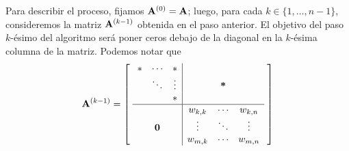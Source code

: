 Para describir el proceso, fijamos $\mathbf{A}^{(0)} = \mathbf{A}$; luego, para
cada $k \in \{1,\dots,n-1\}$, consideremos la matriz $\mathbf{A}^{(k-1)}$
obtenida en el paso anterior.
El objetivo del paso $k$-ésimo del algoritmo será poner ceros debajo de
la diagonal en la $k$-ésima columna de la matriz. Podemos notar que
\[
\mathbf{A}^{(k-1)} = \left[ \hspace{.1cm} \begin{array}{ccc|ccc}
    \ast & \cdots  & \ast   &         &            &         \\
         & \ddots  & \vdots &         & \textbf{*} &         \\
         &         & \ast   &         &            &         \\ \hline
         &         &        & w_{k,k} & \cdots     & w_{k,n} \\
         & \mathbf{0} &        & \vdots  & \ddots     & \vdots  \\
         &         &        & w_{m,k} & \cdots     & w_{m,n} \\
\end{array} \hspace{.1cm} \right]
\]


